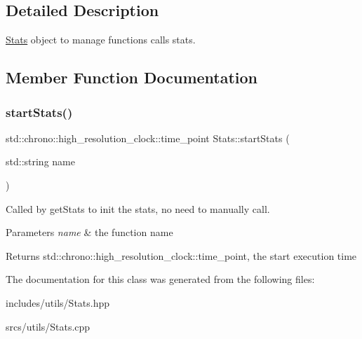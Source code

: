 \subsection{Detailed Description}
\hyperlink{class_stats}{Stats} object to manage functions calls stats. 

\subsection{Member Function Documentation}
\mbox{\label{class_stats_a4a300a5e0856dee0d136ac3828cd28bb}} 
\subsubsection{\texorpdfstring{start\+Stats()}{startStats()}}
{\footnotesize\ttfamily std\+::chrono\+::high\+\_\+resolution\+\_\+clock\+::time\+\_\+point Stats\+::start\+Stats (\begin{DoxyParamCaption}\item[{std\+::string}]{name }\end{DoxyParamCaption})\hspace{0.3cm}{\ttfamily [static]}}



Called by get\+Stats to init the stats, no need to manually call. 


\begin{DoxyParams}{Parameters}
{\em name} & the function name \\
\hline
\end{DoxyParams}
\begin{DoxyReturn}{Returns}
std\+::chrono\+::high\+\_\+resolution\+\_\+clock\+::time\+\_\+point, the start execution time 
\end{DoxyReturn}


The documentation for this class was generated from the following files\+:\begin{DoxyCompactItemize}
\item 
includes/utils/Stats.\+hpp\item 
srcs/utils/Stats.\+cpp\end{DoxyCompactItemize}
